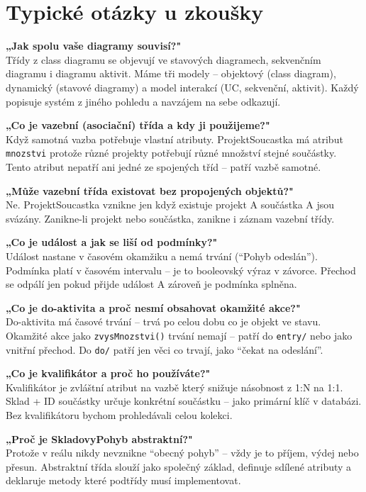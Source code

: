 \documentclass[12pt, a4paper]{article}
\begin{document}
\section{Typické otázky u zkoušky}

\textbf{„Jak spolu vaše diagramy souvisí?"}\\
Třídy z class diagramu se objevují ve stavových diagramech, sekvenčním diagramu i diagramu aktivit. Máme tři modely -- objektový (class diagram), dynamický (stavové diagramy) a model interakcí (UC, sekvenční, aktivit). Každý popisuje systém z jiného pohledu a navzájem na sebe odkazují.

\textbf{„Co je vazební (asociační) třída a kdy ji použijeme?"}\\
Když samotná vazba potřebuje vlastní atributy. ProjektSoucastka má atribut \texttt{mnozstvi} protože různé projekty potřebují různé množství stejné součástky. Tento atribut nepatří ani jedné ze spojených tříd -- patří vazbě samotné.

\textbf{„Může vazební třída existovat bez propojených objektů?"}\\
Ne. ProjektSoucastka vznikne jen když existuje projekt A součástka A jsou svázány. Zanikne-li projekt nebo součástka, zanikne i záznam vazební třídy.

\textbf{„Co je událost a jak se liší od podmínky?"}\\
Událost nastane v časovém okamžiku a nemá trvání (``Pohyb odeslán''). Podmínka platí v časovém intervalu -- je to booleovský výraz v závorce. Přechod se odpálí jen pokud přijde událost A zároveň je podmínka splněna.

\textbf{„Co je do-aktivita a proč nesmí obsahovat okamžité akce?"}\\
Do-aktivita má časové trvání -- trvá po celou dobu co je objekt ve stavu. Okamžité akce jako \texttt{zvysMnozstvi()} trvání nemají -- patří do \texttt{entry/} nebo jako vnitřní přechod. Do \texttt{do/} patří jen věci co trvají, jako ``čekat na odeslání''.

\textbf{„Co je kvalifikátor a proč ho používáte?"}\\
Kvalifikátor je zvláštní atribut na vazbě který snižuje násobnost z 1:N na 1:1. Sklad + ID součástky určuje konkrétní součástku -- jako primární klíč v databázi. Bez kvalifikátoru bychom prohledávali celou kolekci.

\textbf{„Proč je SkladovyPohyb abstraktní?"}\\
Protože v reálu nikdy nevznikne ``obecný pohyb'' -- vždy je to příjem, výdej nebo přesun. Abstraktní třída slouží jako společný základ, definuje sdílené atributy a deklaruje metody které podtřídy musí implementovat.
\end{document}
